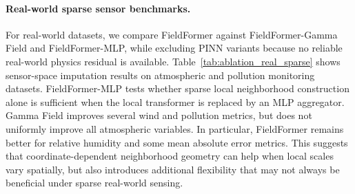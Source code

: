 \begin{table}[htbp]
\centering
\caption{Ablation study on synthetic PDE benchmarks: global field reconstruction. Dense reference fields are available for these datasets. Lower is better.}
\label{tab:ablation_synthetic_global}
\end{table}

\paragraph{Real-world sparse sensor benchmarks.}
For real-world datasets, we compare FieldFormer against FieldFormer-Gamma Field and FieldFormer-MLP, while excluding PINN variants because no reliable real-world physics residual is available. Table~\ref{tab:ablation_real_sparse} shows sensor-space imputation results on atmospheric and pollution monitoring datasets. FieldFormer-MLP tests whether sparse local neighborhood construction alone is sufficient when the local transformer is replaced by an MLP aggregator. Gamma Field improves several wind and pollution metrics, but does not uniformly improve all atmospheric variables. In particular, FieldFormer remains better for relative humidity and some mean absolute error metrics. This suggests that coordinate-dependent neighborhood geometry can help when local scales vary spatially, but also introduces additional flexibility that may not always be beneficial under sparse real-world sensing.


